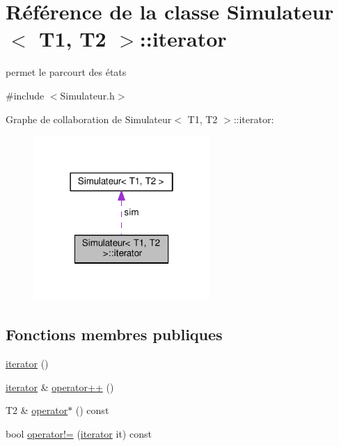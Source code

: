 \hypertarget{class_simulateur_1_1iterator}{}\section{Référence de la classe Simulateur$<$ T1, T2 $>$\+:\+:iterator}
\label{class_simulateur_1_1iterator}


permet le parcourt des états  




{\ttfamily \#include $<$Simulateur.\+h$>$}



Graphe de collaboration de Simulateur$<$ T1, T2 $>$\+:\+:iterator\+:
\nopagebreak
\begin{figure}[H]
\begin{center}
\leavevmode
\includegraphics[width=190pt]{class_simulateur_1_1iterator__coll__graph}
\end{center}
\end{figure}
\subsection*{Fonctions membres publiques}
\begin{DoxyCompactItemize}
\item 
\hyperlink{class_simulateur_1_1iterator_a58f9a120930f75d59cc51448522b4870}{iterator} ()
\item 
\hyperlink{class_simulateur_1_1iterator}{iterator} \& \hyperlink{class_simulateur_1_1iterator_a07d32e6e5ea6ab1f8af9a23477cc8e23}{operator++} ()
\item 
T2 \& \hyperlink{class_simulateur_1_1iterator_a878896cca49dae651ef66a2197856772}{operator$\ast$} () const 
\item 
bool \hyperlink{class_simulateur_1_1iterator_ac3692e096d4fc5005eb915f46c562efe}{operator!=} (\hyperlink{class_simulateur_1_1iterator}{iterator} it) const 
\end{DoxyCompactItemize}
